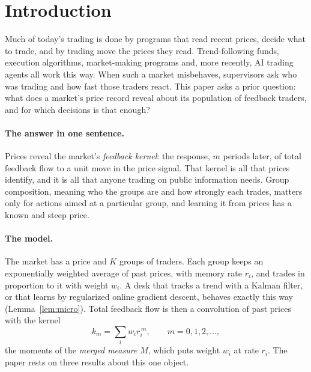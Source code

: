 \documentclass[12pt]{article}
\theoremstyle{definition}
\theoremstyle{remark}
\begin{document}
\endgroup
\newpage
\pagestyle{fancy}
\setcounter{page}{1}

\section{Introduction}\label{sec:intro}

Much of today's trading is done by programs that read recent prices, decide what to trade, and by trading move the prices they read. Trend-following funds, execution algorithms, market-making programs and, more recently, AI trading agents all work this way. When such a market misbehaves, supervisors ask who was trading and how fast those traders react. This paper asks a prior question: what does a market's price record reveal about its population of feedback traders, and for which decisions is that enough?

\paragraph{The answer in one sentence.} Prices reveal the market's \emph{feedback kernel}: the response, $m$ periods later, of total feedback flow to a unit move in the price signal. That kernel is all that prices identify, and it is all that anyone trading on public information needs. Group composition, meaning who the groups are and how strongly each trades, matters only for actions aimed at a particular group, and learning it from prices has a known and steep price.

\paragraph{The model.} The market has a price and $K$ groups of traders. Each group keeps an exponentially weighted average of past prices, with memory rate $r_i$, and trades in proportion to it with weight $w_i$. A desk that tracks a trend with a Kalman filter, or that learns by regularized online gradient descent, behaves exactly this way (Lemma~\ref{lem:micro}). Total feedback flow is then a convolution of past prices with the kernel
\[
 k_m=\sum_i w_i r_i^{\,m},\qquad m=0,1,2,\ldots,
\]
the moments of the \emph{merged measure} $M$, which puts weight $w_i$ at rate $r_i$. The paper rests on three results about this one object.
\end{document}
